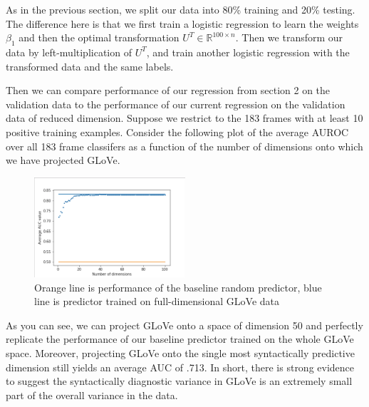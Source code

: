 \documentclass[a4paper]{article}
\begin{document}
As in the previous section, we split our data into 80\% training and 20\% testing. The difference here is that we first train a logistic regression to learn the weights $\beta_1$ and then the optimal transformation $U^T \in \mathbb{R}^{100 \times n}$. Then we transform our data by left-multiplication of $U^T$, and train another logistic regression with the transformed data and the same labels. 

Then we can compare performance of our regression from section 2 on the validation data to the performance of our current regression on the validation data of reduced dimension. Suppose we restrict to the 183 frames with at least 10 positive training examples. Consider the following plot of the average AUROC over all 183 frame classifers as a function of the number of dimensions onto which we have projected GLoVe.

\begin{figure}[H]
	\centering
	\includegraphics[width=0.5\textwidth]{aucbydimension.png}
	\caption{\label{fig:frog} Orange line is performance of the baseline random predictor, blue line is predictor trained on full-dimensional GLoVe data}
\end{figure}

As you can see, we can project GLoVe onto a space of dimension 50 and perfectly replicate the performance of our baseline predictor trained on the whole GLoVe space. Moreover, projecting GLoVe onto the single most syntactically predictive dimension still yields an average AUC of .713. In short, there is strong evidence to suggest the syntactically diagnostic variance in GLoVe is an extremely small part of the overall variance in the data. 
\end{document}
